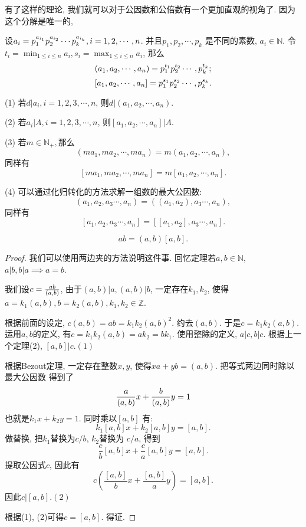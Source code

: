 有了这样的理论, 我们就可以对于公因数和公倍数有一个更加直观的视角了. 因为这个分解是唯一的, 
\begin{theorem}[最大公因数和最小公倍数与唯一分解定理]
    设$a_i=p_{1}^{a_{i_1}} p_{2}^{a_{i_2}} \cdots p_{k}^{a_{i_k}}, i=1,2,\cdots,n$. 
    并且$p_1, p_2, \cdots, p_k$ 是不同的素数, $a_i\in \mathbb N$. 
    令$t_i=\min_{1\leq i\leq n}a_i, s_i=\max_{1\leq i\leq n}a_i$, 那么 
    $$(a_1, a_2, \cdots, a_n)=p_{1}^{t_{1}} p_{2}^{t_{2}} \cdots, p_{k}^{t_{k}};$$ 
    $$[a_1, a_2, \cdots, a_n]=p_{1}^{s_{1}} p_{2}^{s_{2}} \cdots, p_{k}^{s_{k}}. $$
\end{theorem}

\begin{theorem}
    (1) 若$d|a_i, i=1,2,3,\cdots, n$, 则$d|(a_1, a_2, \cdots, a_n)$.
    
    (2) 若$a_i|A, i=1,2,3,\cdots, n$, 则$[a_1, a_2,\cdots, a_n] | A$. 
    
    (3) 若$m\in \mathbb N_+, $那么$$(ma_1, ma_2, \cdots, ma_n) = m(a_1, a_2,
    \cdots, a_n),$$同样有$$[ma_1, ma_2, \cdots, ma_n] = m[a_1, a_2,
    \cdots, a_n].$$

    (4) 可以通过化归转化的方法求解一组数的最大公因数: 
    $$(a_1, a_2,a_3\cdots, a_n)=((a_1, a_2),a_3\cdots, a_n), $$同样有
    $$[a_1, a_2,a_3\cdots, a_n]=[[a_1, a_2],a_3\cdots, a_n]. $$
\end{theorem}

\begin{theorem}
    $$ab=(a,b)[a,b].$$
\end{theorem}

\begin{proof}
    我们可以使用两边夹的方法说明这件事. 回忆定理若$a,b\in \mathbb N$, $a|b, b|a\implies 
    a=b$. 

    我们设$c={ab\over (a,b)}$, 由于$(a,b)|a, (a,b)|b$, 一定存在$k_1, k_2$, 使得
    $a=k_1(a,b), b=k_2(a, b), k_1,k_2\in \mathbb Z$. 
    
    根据前面的设定, $c(a,b)=ab=k_1k_2(a,b)^2$. 约去$(a,b)$. 于是$c=k_1k_2(a,b)$. 
    运用$a,b$的定义, 有$c=k_1k_2(a,b)=ak_2=bk_1$. 使用整除的定义, $a|c, b|c$. 
    根据上一个定理(2), $[a,b]|c. (1)$

    根据Bezout定理, 一定存在整数$x,y$, 使得$xa+yb=(a,b)$. 把等式两边同时除以最大公因数
    得到了$${a\over(a,b)}x+{b\over(a,b)}y=1$$也就是$k_1x+k_2y=1.$ 同时乘以$[a,b]$
    有: $$k_1[a,b]x+k_2[a,b]y=[a,b].$$ 做替换, 把$k_1$替换为$c/b$, $k_2$替换为 
    $c/a$, 得到$$\frac cb [a,b]x+\frac ca[a,b]y=[a,b].$$ 提取公因式$c$, 因此有
    $$c\left(\frac  {[a,b]}{b}x+\frac {[a,b]}{a}y\right)=[a,b].$$ 因此$c|[a,b]. (2)$

    根据(1), (2)可得$c=[a,b]$. 得证. 
\end{proof}

